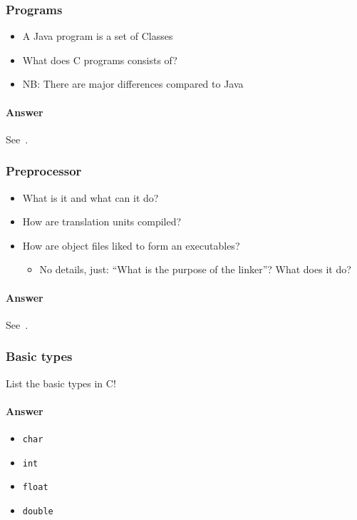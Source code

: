 
\subsubsection*{Programs}
\begin{itemize}
\item A Java program is a set of Classes
\item What does C programs consists of?
\item NB: There are major differences compared to Java
\end{itemize}

\paragraph{Answer}
See~.

\subsubsection*{Preprocessor}
\begin{itemize}
  \item What is it and what can it do?
  \item How are translation units compiled?
  \item How are object files liked to form an executables?
    \begin{itemize}
      \item No details, just: “What is the purpose of the linker”? What does it do?
    \end{itemize}
\end{itemize}

\paragraph{Answer}
See~.

\subsubsection*{Basic types}
List the basic types in C!

\paragraph{Answer}
\begin{itemize}
  \item \texttt{char}
  \item \texttt{int}
  \item \texttt{float}
  \item \texttt{double}
\end{itemize}

